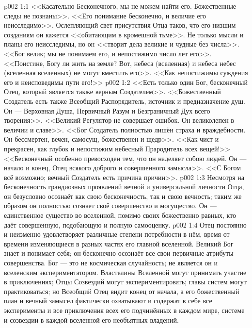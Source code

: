 \vs p002 1:1 <<Касательно Бесконечного, мы не можем найти его. Божественные следы не познаны>>. <<Его понимание бесконечно, и величие его неисследимо>>. Ослепляющий свет присутствия Отца таков, что его низшим созданиям он кажется <<обитающим в кромешной тьме>>. Не только мысли и планы его неисследимы, но он <<творит дела великие и чудные без числа>>. <<Бог велик; мы не понимаем его, и непостижимо число лет его>>. <<Поистине, Богу ли жить на земле? Вот, небеса (вселенная) и небеса небес (вселенная вселенных) не могут вместить его>>. <<Как непостижимы суждения его и неисповедимы пути его!>>
\vs p002 1:2 <<Есть только один Бог, бесконечный Отец, который является также верным Создателем>>. <<Божественный Создатель есть также Всеобщий Распорядитель, источник и предназначение душ. Он --- Верховная Душа, Первичный Разум и Безграничный Дух всего творения>>. <<Великий Регулятор не совершает ошибок. Он великолепен в величии и славе>>. <<Бог Создатель полностью лишён страха и враждебности. Он бессмертен, вечен, самосущ, божественен и щедр>>. <<Как чист и прекрасен, как глубок и непостижим небесный Прародитель всех вещей!>> <<Бесконечный особенно превосходен тем, что он наделяет собою людей. Он --- начало и конец, Отец всякого доброго и совершенного замысла>>. <<С Богом всё возможно; вечный Создатель есть причина причин>>.
\vs p002 1:3 \pc Несмотря на бесконечность грандиозных проявлений вечной и универсальной личности Отца, он безусловно осознаёт как свою бесконечность, так и свою вечность; таким же образом он полностью сознает своё совершенство и могущество. Он --- единственное существо во вселенной, помимо своих божественно равных, кто даёт совершенную, подобающую и полную самооценку.
\vs p002 1:4 Отец постоянно и неизменно удовлетворяет различные степени потребности в нём, время от времени изменяющиеся в разных частях его главной вселенной. Великий Бог знает и понимает себя; он бесконечно осознаёт все свои первичные атрибуты совершенства. Бог --- это не космическая случайность; не является он и вселенским экспериментатором. Властелины Вселенной могут принимать участие в приключениях; Отцы Созвездий могут экспериментировать; главы систем могут практиковаться; но Всеобщий Отец видит конец от начала, а его божественный план и вечный замысел фактически охватывают и содержат в себе все эксперименты и все приключения всех его подчинённых в каждом мире, системе и созвездии в каждой вселенной его необъятных владений.
